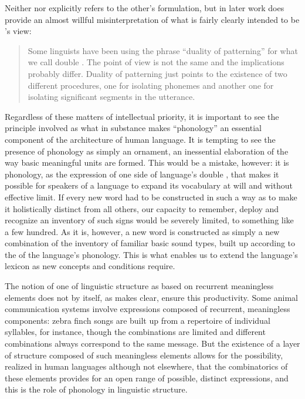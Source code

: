 Neither {\Martinet} nor {\Hockett} explicitly refers to the other's
formulation, but in later work {\Martinet} does provide an almost willful
misinterpretation of what is fairly clearly intended to be {\Hockett}'s
view:

\begin{quotation}
  Some linguists have been using the phrase ``duality of patterning''
  for what we call double . The point of view is not the
  same and the implications probably differ. Duality of patterning
  just points to the existence of two different procedures, one for
  isolating phonemes and another one for isolating significant
  segments in the utterance.\\
  \citep[34]{martinet84:double.articulation}
\end{quotation}

Regardless of these matters of intellectual priority, it is
important to see the principle involved as what in substance makes
``phonology'' an essential component of the architecture of human
language. It is tempting to see the presence of phonology as simply an
ornament, an inessential elaboration of the way basic meaningful units
are formed.  This would be a mistake, however: it is phonology, as the
expression of one side of language's double , that makes
it possible for speakers of a language to expand its vocabulary at
will and without effective limit.  If every new word had to be
constructed in such a way as to make it holistically distinct from all
others, our capacity to remember, deploy and recognize an inventory of
such signs would be severely limited, to something like a few
hundred. As it is, however, a new word is constructed as simply a new
combination of the inventory of familiar basic sound types, built up
according to the  of the language's phonology.  This is
what enables us to extend the language's lexicon as new concepts and
conditions require.

The notion of one  of linguistic structure as based on
recurrent meaningless elements does not by itself, as
\citet{ladd14:duality} makes clear, ensure this productivity. Some
animal communication systems involve expressions composed of
recurrent, meaningless components: zebra finch songs
\citep{lawson.etal18:zebra.finch.song} are built up from a repertoire
of individual syllables, for instance, though the combinations are limited and
different combinations always correspond to the same message. But the
existence of a layer of structure composed of such meaningless
elements allows for the possibility, realized in human languages
although not elsewhere, that the combinatorics of these elements
provides for an open range of possible, distinct expressions, and this
is the role of phonology in linguistic structure.

